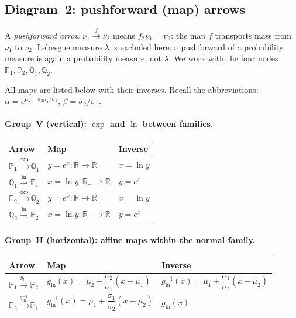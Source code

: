 \documentclass[11pt,a4paper]{article}
\newcommand{\R}{\mathbb{R}}
\newcommand{\Rp}{\mathbb{R}_{+}}
\begin{document}
\subsection{Diagram~2: pushforward (map) arrows}
\label{sec:diag2}

A \emph{pushforward arrow} $\nu_1\xrightarrow{f}\nu_2$ means $f_*\nu_1=\nu_2$: the map $f$
transports mass from $\nu_1$ to $\nu_2$.  Lebesgue measure $\lambda$ is excluded here: a
pushforward of a probability measure is again a probability measure, not $\lambda$.  We work
with the four nodes $\mathbb{P}_1,\mathbb{P}_2,\mathbb{Q}_1,\mathbb{Q}_2$.

All maps are listed below with their inverses.  Recall the abbreviations:
$\alpha=e^{\mu_2-\sigma_2\mu_1/\sigma_1}$, $\beta=\sigma_2/\sigma_1$.

\paragraph{Group~V (vertical): $\exp$ and $\ln$ between families.}

\begin{center}
\renewcommand{\arraystretch}{1.6}
\begin{tabular}{lll}
\toprule
Arrow & Map & Inverse \\
\midrule
$\mathbb{P}_1\xrightarrow{\exp}\mathbb{Q}_1$
  & $y=e^x:\R\to\Rp$
  & $x=\ln y$ \\
$\mathbb{Q}_1\xrightarrow{\ln}\mathbb{P}_1$
  & $x=\ln y:\Rp\to\R$
  & $y=e^x$ \\
$\mathbb{P}_2\xrightarrow{\exp}\mathbb{Q}_2$
  & $y=e^x:\R\to\Rp$
  & $x=\ln y$ \\
$\mathbb{Q}_2\xrightarrow{\ln}\mathbb{P}_2$
  & $x=\ln y:\Rp\to\R$
  & $y=e^x$ \\
\bottomrule
\end{tabular}
\end{center}

\paragraph{Group~H (horizontal): affine maps within the normal family.}

\begin{center}
\renewcommand{\arraystretch}{1.6}
\begin{tabular}{lll}
\toprule
Arrow & Map & Inverse \\
\midrule
$\mathbb{P}_1\xrightarrow{g_{\ln}}\mathbb{P}_2$
  & $g_{\ln}(x)=\mu_2+\dfrac{\sigma_2}{\sigma_1}(x-\mu_1)$
  & $g_{\ln}^{-1}(x)=\mu_1+\dfrac{\sigma_1}{\sigma_2}(x-\mu_2)$ \\[4pt]
$\mathbb{P}_2\xrightarrow{g_{\ln}^{-1}}\mathbb{P}_1$
  & $g_{\ln}^{-1}(x)=\mu_1+\dfrac{\sigma_1}{\sigma_2}(x-\mu_2)$
  & $g_{\ln}(x)$ \\
\bottomrule
\end{tabular}
\end{center}
\end{document}
